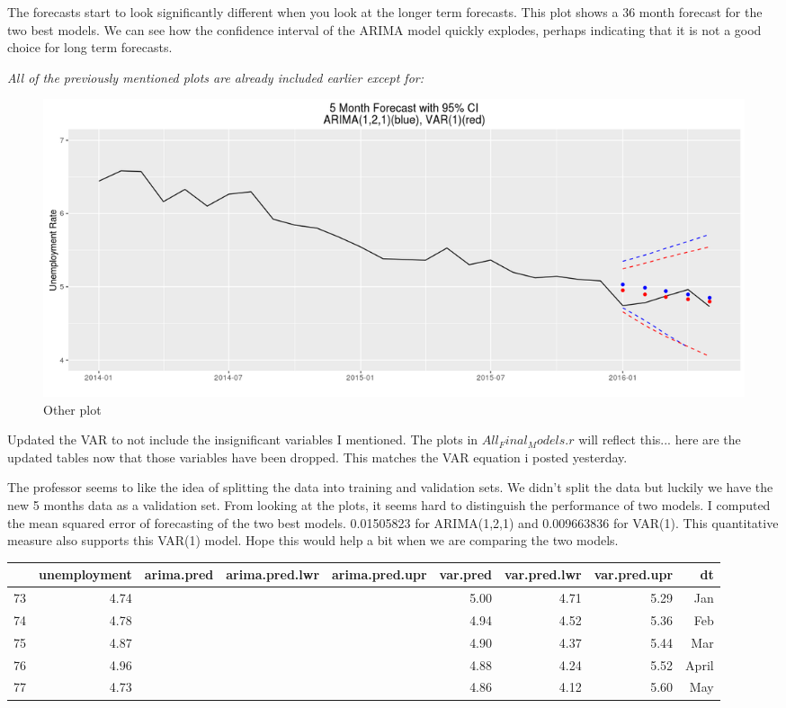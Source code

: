\documentclass[twoside,twocolumn]{article}
\begin{document}
The forecasts start to look significantly different when you look at the longer term forecasts. This plot shows a 36 month forecast for the two best models. We can see how the confidence interval of the ARIMA model quickly explodes, perhaps indicating that it is not a good choice for long term forecasts.

\textit{All of the previously mentioned plots are already included earlier except for:}
    \begin{figure}[htb]
    	\centering
     	\caption{Other plot}
     	\includegraphics[width=\linewidth]{images/arimavarforcastalso}
 \end{figure}
 


Updated the VAR to not include the insignificant variables I mentioned. The plots in \(All_Final_Models.r\) will reflect this... here are the updated tables now that those variables have been dropped. This matches the VAR equation i posted yesterday.


The professor seems to like the idea of splitting the data into training and validation sets. We didn't split the data but luckily we have the new 5 months data as a validation set. From looking at the plots, it seems hard to distinguish the performance of two models. I computed the mean squared error of forecasting of the two best models. 0.01505823 for ARIMA(1,2,1) and 0.009663836 for VAR(1). This quantitative measure also supports this VAR(1) model. Hope this would help a bit when we are comparing the two models. 

\begin{table}[ht]
\centering
\begin{tabular}{rrrrrrrrr}
  \hline
 & unemployment & arima.pred & arima.pred.lwr & arima.pred.upr & var.pred & var.pred.lwr & var.pred.upr & dt \\ 
  \hline
73 & 4.74 &  &  &  & 5.00 & 4.71 & 5.29 & Jan \\ 
  74 & 4.78 &  &  &  & 4.94 & 4.52 & 5.36 & Feb \\ 
  75 & 4.87 &  &  &  & 4.90 & 4.37 & 5.44 & Mar \\ 
  76 & 4.96 &  &  &  & 4.88 & 4.24 & 5.52 & April \\ 
  77 & 4.73 &  &  &  & 4.86 & 4.12 & 5.60 & May \\ 
   \hline
\end{tabular}
\end{table}
\end{document}
